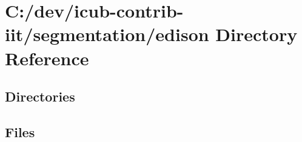 \section{C\+:/dev/icub-\/contrib-\/iit/segmentation/edison Directory Reference}
\label{dir_c8f5c4d6f826361c401baddc9909b4b2}
\subsection*{Directories}
\begin{DoxyCompactItemize}
\end{DoxyCompactItemize}
\subsection*{Files}
\begin{DoxyCompactItemize}
\end{DoxyCompactItemize}
